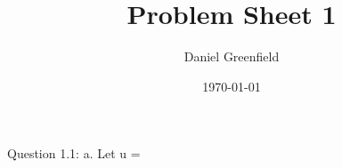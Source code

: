 \documentclass[11pt,a4paper]{article}
\title{Problem Sheet 1}
\author{Daniel Greenfield}
\date{\today}
\begin{document}
\maketitle


Question 1.1:
a. Let u = \
    
\end{document}
